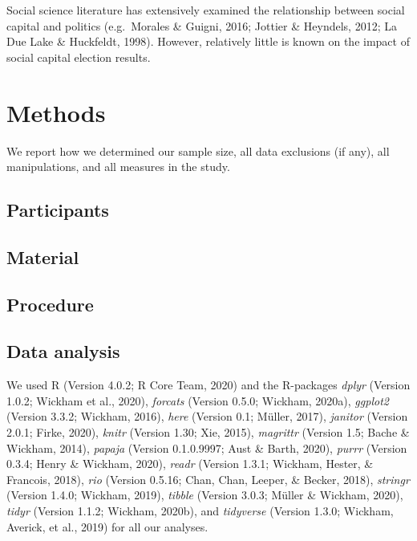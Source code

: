 \documentclass[
  english,
  man]{apa6}
\begin{document}
Social science literature has extensively examined the relationship between social capital and politics (e.g.~Morales \& Guigni, 2016; Jottier \& Heyndels, 2012; La Due Lake \& Huckfeldt, 1998). However, relatively little is known on the impact of social capital election results.

\hypertarget{methods}{%
\section{Methods}\label{methods}}

We report how we determined our sample size, all data exclusions (if any), all manipulations, and all measures in the study.

\hypertarget{participants}{%
\subsection{Participants}\label{participants}}

\hypertarget{material}{%
\subsection{Material}\label{material}}

\hypertarget{procedure}{%
\subsection{Procedure}\label{procedure}}

\hypertarget{data-analysis}{%
\subsection{Data analysis}\label{data-analysis}}

We used R (Version 4.0.2; R Core Team, 2020) and the R-packages \emph{dplyr} (Version 1.0.2; Wickham et al., 2020), \emph{forcats} (Version 0.5.0; Wickham, 2020a), \emph{ggplot2} (Version 3.3.2; Wickham, 2016), \emph{here} (Version 0.1; Müller, 2017), \emph{janitor} (Version 2.0.1; Firke, 2020), \emph{knitr} (Version 1.30; Xie, 2015), \emph{magrittr} (Version 1.5; Bache \& Wickham, 2014), \emph{papaja} (Version 0.1.0.9997; Aust \& Barth, 2020), \emph{purrr} (Version 0.3.4; Henry \& Wickham, 2020), \emph{readr} (Version 1.3.1; Wickham, Hester, \& Francois, 2018), \emph{rio} (Version 0.5.16; Chan, Chan, Leeper, \& Becker, 2018), \emph{stringr} (Version 1.4.0; Wickham, 2019), \emph{tibble} (Version 3.0.3; Müller \& Wickham, 2020), \emph{tidyr} (Version 1.1.2; Wickham, 2020b), and \emph{tidyverse} (Version 1.3.0; Wickham, Averick, et al., 2019) for all our analyses.
\end{document}
